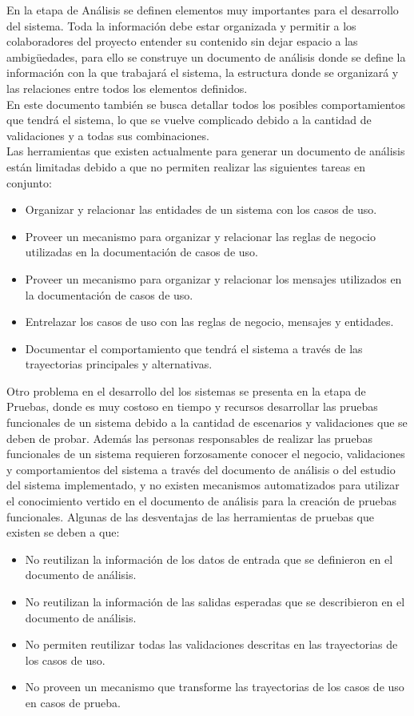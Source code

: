 En la etapa de Análisis se definen elementos muy importantes para el desarrollo del sistema. Toda la información debe estar organizada y permitir
a los colaboradores del proyecto entender su contenido sin dejar espacio a las ambigüedades, para ello se construye un documento de análisis donde se define la información 
con la que trabajará el sistema, la estructura donde se organizará y las relaciones entre todos los elementos definidos.\\

En este documento también se busca detallar todos los posibles comportamientos que tendrá el sistema, lo que se vuelve complicado debido a 
la cantidad de validaciones y a todas sus combinaciones.\\

Las herramientas que existen actualmente para generar un documento de análisis están limitadas debido a que no permiten realizar las siguientes tareas en conjunto:
\begin{itemize}
 \item Organizar y relacionar las entidades de un sistema con los casos de uso.
 \item Proveer un mecanismo para organizar y relacionar las reglas de negocio utilizadas en la documentación de casos de uso.
 \item Proveer un mecanismo para organizar y relacionar los mensajes utilizados en la documentación de casos de uso.
 \item Entrelazar los casos de uso con las reglas de negocio, mensajes y entidades. 
 \item Documentar el comportamiento que tendrá el sistema a través de las trayectorias principales y alternativas.
\end{itemize}

Otro problema en el desarrollo del los sistemas se presenta en la etapa de Pruebas, donde es muy costoso en tiempo y recursos desarrollar las pruebas funcionales
de un sistema debido a la cantidad de escenarios y validaciones que se deben de probar. Además las personas responsables de realizar las pruebas funcionales 
de un sistema requieren forzosamente conocer el negocio, validaciones y comportamientos del sistema a través del documento de análisis o del estudio del 
sistema implementado, y no existen mecanismos automatizados para utilizar el conocimiento vertido en el documento de análisis para la creación de pruebas
funcionales. Algunas de las desventajas de las herramientas de pruebas que existen se deben a que:

\begin{itemize}
 \item No reutilizan la información de los datos de entrada que se definieron en el documento de análisis.
 \item No reutilizan la información de las salidas esperadas que se describieron en el documento de análisis.
 \item No permiten reutilizar todas las validaciones descritas en las trayectorias de los casos de uso.
 \item No proveen un mecanismo que transforme las trayectorias de los casos de uso en casos de prueba.
\end{itemize}